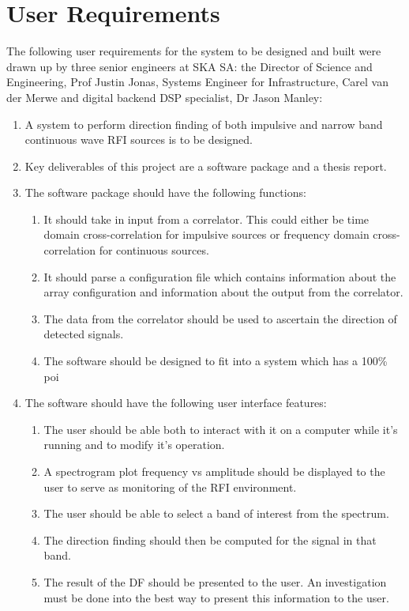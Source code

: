 \section{User Requirements}

The following user requirements for the system to be designed and built were drawn up by three senior engineers at SKA SA: the Director of Science and Engineering, Prof Justin Jonas, Systems Engineer for Infrastructure, Carel van der Merwe and digital backend DSP specialist, Dr Jason Manley:
\begin{enumerate}
  \item A system to perform direction finding of both impulsive and narrow band continuous wave RFI sources is to be designed.
  \item Key deliverables of this project are a software package and a thesis report.
  \item The software package should have the following functions:
    \begin{enumerate}
      \item It should take in input from a correlator. This could either be time domain cross-correlation for impulsive sources or frequency domain cross-correlation for continuous sources. 
      \item It should parse a configuration file which contains information about the array configuration and information about the output from the correlator.
      \item The data from the correlator should be used to ascertain the direction of detected signals.
      \item The software should be designed to fit into a system which has a 100\% \gls{poi}
    \end{enumerate}
  \item The software should have the following user interface features:
    \begin{enumerate}
      \item The user should be able both to interact with it on a computer while it's running and to modify it's operation.
      \item A spectrogram plot frequency vs amplitude should be displayed to the user to serve as monitoring of the RFI environment.
      \item The user should be able to select a band of interest from the spectrum.
      \item The direction finding should then be computed for the signal in that band.
      \item The result of the DF should be presented to the user. An investigation must be done into the best way to present this information to the user.

\end{enumerate}
\end{enumerate}
